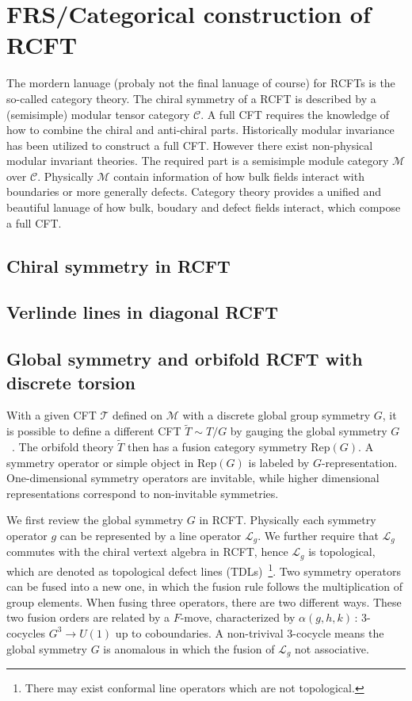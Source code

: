 \section{FRS/Categorical construction of RCFT}
The mordern lanuage (probaly not the final lanuage of course) for RCFTs is the so-called category theory. The chiral symmetry of a RCFT is described by a (semisimple) modular tensor category $\mathcal{C}$. A full CFT requires the knowledge of how to combine the chiral and anti-chiral parts. Historically modular invariance has been utilized to construct a full CFT\@. However there exist non-physical modular invariant theories. The required part is a semisimple module category $\mathcal{M}$ over $\mathcal{C}$. Physically $\mathcal{M}$ contain information of how bulk fields interact with boundaries or more generally defects. Category theory provides a unified and beautiful lanuage of how bulk, boudary and defect fields interact, which compose a full CFT\@. 

\subsection{Chiral symmetry in RCFT}

\subsection{Verlinde lines in diagonal RCFT}

\subsection{Global symmetry and orbifold RCFT with discrete torsion}
With a given CFT $\mathcal{T}$ defined on $\mathcal{M}$ with a discrete global group symmetry $G$, it is possible to define a different CFT $\tilde{T} \sim T/G$ by gauging the global symmetry $G$~\cite{Douglas:aa,Gaberdiel_2000,Chang2019}. The orbifold theory $\tilde{T}$ then has a fusion category symmetry $\mathrm{Rep}(G)$. A symmetry operator or simple object in $\mathrm{Rep}(G)$ is labeled by $G$-representation. One-dimensional symmetry operators are invitable, while higher dimensional representations correspond to non-invitable symmetries. 

We first review the global symmetry $G$ in RCFT\@. Physically each symmetry operator $g$ can be represented by a line operator $\mathcal{L}_g$. We further require that $\mathcal{L}_g$ commutes with the chiral vertext algebra in RCFT, hence $\mathcal{L}_g$ is topological, which are denoted as topological defect lines (TDLs)~\footnote{There may exist conformal line operators which are not topological.}. Two symmetry operators can be fused into a new one, in which the fusion rule follows the multiplication of group elements. When fusing three operators, there are two different ways. These two fusion orders are related by a $F$-move, characterized by $\alpha(g,h,k)\,:\, 3$-cocycles $G^3 \rightarrow U(1)$ up to coboundaries. A non-trivival 3-cocycle means the global symmetry $G$ is anomalous in which the fusion of $\mathcal{L}_g$ not associative.

